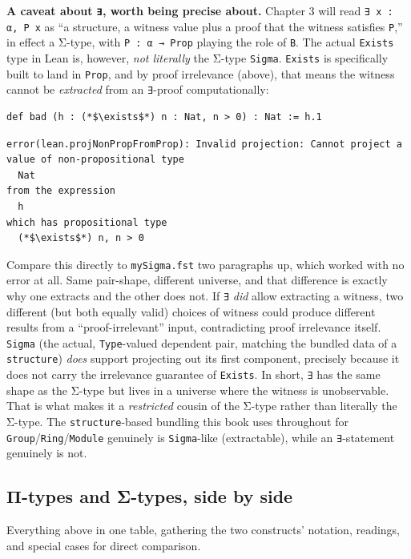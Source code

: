 \textbf{A caveat about \texttt{∃}, worth being precise about.} Chapter 3 will read \texttt{∃ x : α, P x} as ``a structure, a witness value plus a proof that the witness satisfies \texttt{P},'' in effect a Σ-type, with \texttt{P : α → Prop} playing the role of \texttt{B}. The actual \texttt{Exists} type in Lean is, however, \emph{not literally} the Σ-type \texttt{Sigma}. \texttt{Exists} is specifically built to land in \texttt{Prop}, and by proof irrelevance (above), that means the witness cannot be \emph{extracted} from an \texttt{∃}-proof computationally:

\begin{lstlisting}
def bad (h : (*$\exists$*) n : Nat, n > 0) : Nat := h.1
\end{lstlisting}

\begin{lstlisting}
error(lean.projNonPropFromProp): Invalid projection: Cannot project a
value of non-propositional type
  Nat
from the expression
  h
which has propositional type
  (*$\exists$*) n, n > 0
\end{lstlisting}

Compare this directly to \texttt{mySigma.fst} two paragraphs up, which worked with no error at all. Same pair-shape, different universe, and that difference is exactly why one extracts and the other does not. If \texttt{∃} \emph{did} allow extracting a witness, two different (but both equally valid) choices of witness could produce different results from a ``proof-irrelevant'' input, contradicting proof irrelevance itself. \texttt{Sigma} (the actual, \texttt{Type}-valued dependent pair, matching the bundled data of a \texttt{structure}) \emph{does} support projecting out its first component, precisely because it does not carry the irrelevance guarantee of \texttt{Exists}. In short, \texttt{∃} has the same shape as the Σ-type but lives in a universe where the witness is unobservable. That is what makes it a \emph{restricted} cousin of the Σ-type rather than literally the Σ-type. The \texttt{structure}-based bundling this book uses throughout for \texttt{Group}/\texttt{Ring}/\texttt{Module} genuinely is \texttt{Sigma}-like (extractable), while an \texttt{∃}-statement genuinely is not.

\subsection{Π-types and Σ-types, side by side}\label{sec:01-basics:05-pi-sigma-and-coc:5}

Everything above in one table, gathering the two constructs' notation, readings, and special cases for direct comparison.

